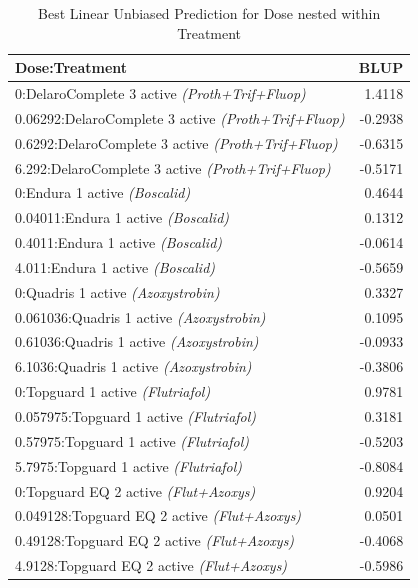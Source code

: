 \documentclass[
  10pt,
  letterpaper,
  twocolumn]{article}
\begin{document}
\begin{table}[ht]
\centering
\small
\caption{Best Linear Unbiased Prediction for Dose nested within Treatment}
\renewcommand{\arraystretch}{1.2}
\begin{tabular}{|p{7.0cm}|r|}
\hline
\textbf{Dose:Treatment} & \textbf{BLUP} \\
\hline
0:DelaroComplete 3 active \textit{(Proth+Trif+Fluop)} & 1.4118 \\
0.06292:DelaroComplete 3 active \textit{(Proth+Trif+Fluop)} & -0.2938 \\
0.6292:DelaroComplete 3 active \textit{(Proth+Trif+Fluop)} & -0.6315 \\
6.292:DelaroComplete 3 active \textit{(Proth+Trif+Fluop)} & -0.5171 \\
0:Endura 1 active \textit{(Boscalid)} & 0.4644 \\
0.04011:Endura 1 active \textit{(Boscalid)} & 0.1312 \\
0.4011:Endura 1 active \textit{(Boscalid)} & -0.0614 \\
4.011:Endura 1 active \textit{(Boscalid)} & -0.5659 \\
0:Quadris 1 active \textit{(Azoxystrobin)} & 0.3327 \\
0.061036:Quadris 1 active \textit{(Azoxystrobin)} & 0.1095 \\
0.61036:Quadris 1 active \textit{(Azoxystrobin)} & -0.0933 \\
6.1036:Quadris 1 active \textit{(Azoxystrobin)} & -0.3806 \\
0:Topguard 1 active \textit{(Flutriafol)} & 0.9781 \\
0.057975:Topguard 1 active \textit{(Flutriafol)} & 0.3181 \\
0.57975:Topguard 1 active \textit{(Flutriafol)} & -0.5203 \\
5.7975:Topguard 1 active \textit{(Flutriafol)} & -0.8084 \\
0:Topguard EQ 2 active \textit{(Flut+Azoxys)} & 0.9204 \\
0.049128:Topguard EQ 2 active \textit{(Flut+Azoxys)} & 0.0501 \\
0.49128:Topguard EQ 2 active \textit{(Flut+Azoxys)} & -0.4068 \\
4.9128:Topguard EQ 2 active \textit{(Flut+Azoxys)} & -0.5986 \\
\hline
\end{tabular}
\end{table}

\vspace{0.1cm}
\end{document}
